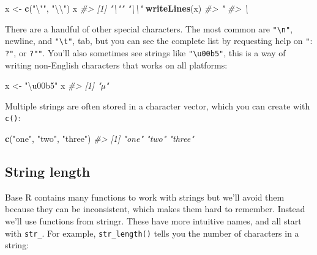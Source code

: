 \documentclass[]{book}
\newenvironment{Shaded}{\begin{snugshade}}{\end{snugshade}}
\newcommand{\KeywordTok}[1]{\textcolor[rgb]{0.13,0.29,0.53}{\textbf{{#1}}}}
\newcommand{\CharTok}[1]{\textcolor[rgb]{0.31,0.60,0.02}{{#1}}}
\newcommand{\StringTok}[1]{\textcolor[rgb]{0.31,0.60,0.02}{{#1}}}
\newcommand{\CommentTok}[1]{\textcolor[rgb]{0.56,0.35,0.01}{\textit{{#1}}}}
\newcommand{\NormalTok}[1]{{#1}}
\begin{document}
\begin{Shaded}
\begin{Highlighting}[]
\NormalTok{x <-}\StringTok{ }\KeywordTok{c}\NormalTok{(}\StringTok{"}\CharTok{\textbackslash{}"}\StringTok{"}\NormalTok{, }\StringTok{"}\CharTok{\textbackslash{}\textbackslash{}}\StringTok{"}\NormalTok{)}
\NormalTok{x}
\CommentTok{#> [1] "\textbackslash{}"" "\textbackslash{}\textbackslash{}"}
\KeywordTok{writeLines}\NormalTok{(x)}
\CommentTok{#> "}
\CommentTok{#> \textbackslash{}}
\end{Highlighting}
\end{Shaded}

There are a handful of other special characters. The most common are
\texttt{"\textbackslash{}n"}, newline, and \texttt{"\textbackslash{}t"},
tab, but you can see the complete list by requesting help on \texttt{"}:
\texttt{?\textquotesingle{}"\textquotesingle{}}, or
\texttt{?"\textquotesingle{}"}. You'll also sometimes see strings like
\texttt{"\textbackslash{}u00b5"}, this is a way of writing non-English
characters that works on all platforms:

\begin{Shaded}
\begin{Highlighting}[]
\NormalTok{x <-}\StringTok{ "\textbackslash{}u00b5"}
\NormalTok{x}
\CommentTok{#> [1] "µ"}
\end{Highlighting}
\end{Shaded}

Multiple strings are often stored in a character vector, which you can
create with \texttt{c()}:

\begin{Shaded}
\begin{Highlighting}[]
\KeywordTok{c}\NormalTok{(}\StringTok{"one"}\NormalTok{, }\StringTok{"two"}\NormalTok{, }\StringTok{"three"}\NormalTok{)}
\CommentTok{#> [1] "one"   "two"   "three"}
\end{Highlighting}
\end{Shaded}

\subsection{String length}\label{string-length}

Base R contains many functions to work with strings but we'll avoid them
because they can be inconsistent, which makes them hard to remember.
Instead we'll use functions from stringr. These have more intuitive
names, and all start with \texttt{str\_}. For example,
\texttt{str\_length()} tells you the number of characters in a string:
\end{document}
